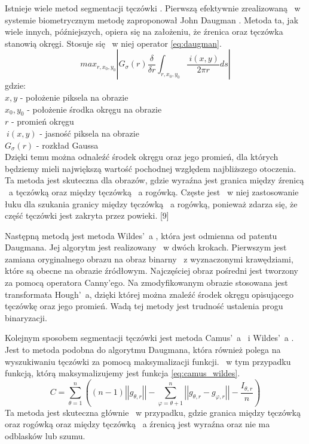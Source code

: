Istnieje wiele metod segmentacji tęczówki \cite{PrAl06}. Pierwszą efektywnie zrealizowaną ~w systemie biometrycznym metodę zaproponował John Daugman \cite{Daugman}. Metoda ta, jak wiele innych, późniejszych, opiera się na założeniu, że źrenica oraz tęczówka stanowią okręgi. Stosuje się ~w niej operator \ref{eq:daugman}.
\begin{equation}
\label{eq:daugman}
max_{r,x_{0},y_{0}}\left| G_{\sigma}(r) \frac{\delta}{\delta r}\int_{r,x_{0},y_{0}} \frac{~i(x,y)}{2\pi r}ds \right|
\end{equation}
gdzie:\\
$ x,y $ - położenie piksela na obrazie \\
$ x_{0}, y_{0} $ - położenie środka okręgu na obrazie \\
$ r $ - promień okręgu \\
$ ~i(x,y) $ - jasność piksela na obrazie\\
$ G_{\sigma}(r) $ - rozkład Gaussa\\

Dzięki temu można odnaleźć środek okręgu oraz jego promień, dla których będziemy mieli największą wartość pochodnej względem najbliższego otoczenia. Ta metoda jest skuteczna dla obrazów, gdzie wyraźna jest granica między źrenicą ~a tęczówką oraz między tęczówką ~a rogówką. Częste jest ~w niej zastosowanie łuku dla szukania granicy między tęczówką ~a rogówką, ponieważ zdarza się, że część tęczówki jest zakryta przez powieki. [9]

Następną metodą jest metoda Wildes'~a \cite{Wildes}, która jest odmienna od patentu Daugmana. Jej algorytm jest realizowany ~w dwóch krokach. Pierwszym jest zamiana oryginalnego obrazu na obraz binarny ~z wyznaczonymi krawędziami, które są obecne na obrazie źródłowym. Najczęściej obraz pośredni jest tworzony za pomocą operatora Canny'ego. Na zmodyfikowanym obrazie stosowana jest transformata Hough'~a, dzięki której można znaleźć środek okręgu opisującego tęczówkę oraz jego promień. Wadą tej metody jest trudność ustalenia progu binaryzacji.

Kolejnym sposobem segmentacji tęczówki jest metoda Camus'~a ~i Wildes'~a \cite{Camus}. Jest to metoda podobna do algorytmu Daugmana, która również polega na wyszukiwaniu tęczówki za pomocą maksymalizacji funkcji. ~w tym przypadku funkcją, którą maksymalizujemy jest funkcja \ref{eq:camus_wildes}. 
\begin{equation}
\label{eq:camus_wildes}
C=\sum_{\theta =1}^{n} ((n-1)\left|\left| g_{\theta,r} \right|\right| - \sum_{\varphi=\theta + 1 } ^{n} \left| \left| g_{\theta,r} - g_{\varphi,r} \right| \right| - \frac{I_{\theta,r}}{n}  )
\end{equation}
Ta metoda jest skuteczna głównie ~w przypadku, gdzie granica między tęczówką oraz rogówką oraz między tęczówką ~a źrenicą jest wyraźna oraz nie ma odblasków lub szumu.

